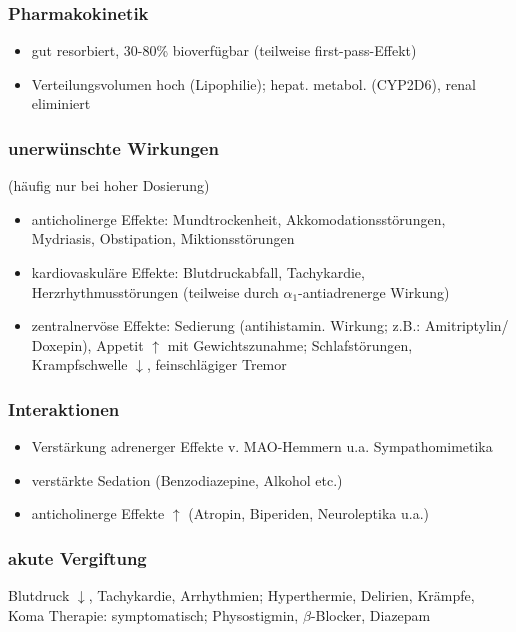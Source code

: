 \documentclass[10pt,a4paper]{report}
\begin{document}
\subsubsection{Pharmakokinetik} %
\label{ssub:pharmakokinetik}
\begin{itemize}
	\item gut resorbiert, 30-80\% bioverfügbar (teilweise first-pass-Effekt)
	\item Verteilungsvolumen hoch (Lipophilie); hepat. metabol. (CYP2D6), renal eliminiert
\end{itemize}
\subsubsection{unerwünschte Wirkungen} %
\label{ssub:subsubsection_name}
(häufig nur bei hoher Dosierung)
\begin{itemize}
	\item anticholinerge Effekte: Mundtrockenheit, Akkomodationsstörungen,
			Mydriasis, Obstipation, Miktionsstörungen
	\item kardiovaskuläre Effekte: Blutdruckabfall, Tachykardie, Herzrhythmusstörungen
			(teilweise durch $\alpha_1$-antiadrenerge Wirkung)
	\item zentralnervöse Effekte: Sedierung (antihistamin. Wirkung; z.B.: Amitriptylin/ Doxepin), Appetit $\uparrow$ mit Gewichtszunahme; Schlafstörungen, Krampfschwelle $\downarrow$, feinschlägiger Tremor
\end{itemize}
\subsubsection{Interaktionen} %
\label{ssub:interaktionen}
\begin{itemize}
	\item Verstärkung adrenerger Effekte v. MAO-Hemmern u.a. Sympathomimetika	
	\item verstärkte  Sedation (Benzodiazepine, Alkohol etc.)
	\item anticholinerge Effekte $\uparrow$ (Atropin, Biperiden, Neuroleptika u.a.)
\end{itemize}
\subsubsection{akute Vergiftung} %
\label{ssub:akute_vergiftung}
Blutdruck $\downarrow$, Tachykardie, Arrhythmien; Hyperthermie, Delirien, Krämpfe, Koma Therapie: symptomatisch; Physostigmin, $\beta$-Blocker, Diazepam
\end{document}
